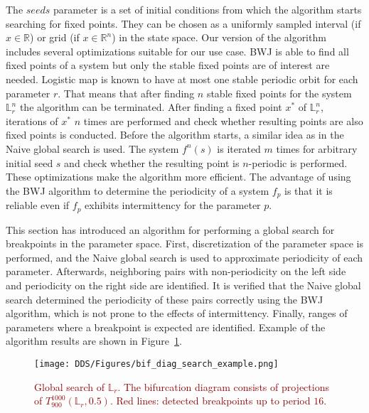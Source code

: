 The $seeds$ parameter is a set of initial conditions from which the algorithm starts searching for fixed points.
They can be chosen as a uniformly sampled interval (if $x \in \mathbb{R}$) or grid (if $x \in \mathbb{R}^{n}$) in the state space.
Our version of the algorithm includes several optimizations suitable for our use case.
BWJ is able to find all fixed points of a system but only the stable fixed points are of interest are needed.
Logistic map is known to have at most one stable periodic orbit for each parameter $r$.
That means that after finding $n$ stable fixed points for the system $\mathbb{L}_{r}^{n}$ the algorithm can be terminated.
After finding a fixed point $x^{*}$ of $\mathbb{L}_{r}^{n}$, iterations of $x^{*}$ $n$ times are performed and check whether resulting points are also fixed points is conducted.
Before the algorithm starts, a similar idea as in the Naive global search is used.
The system $f^{n}(s)$ is iterated $m$ times for arbitrary initial seed $s$ and check whether the resulting point is $n$-periodic is performed.
These optimizations make the algorithm more efficient.
The advantage of using the BWJ algorithm to determine the periodicity of a system $f_{p}$ is that it is reliable even if $f_{p}$ exhibits intermittency for the parameter $p$.
\par
This section has introduced an algorithm for performing a global search for breakpoints in the parameter space.
First, discretization of the parameter space is performed, and the Naive global search is used to approximate periodicity of each parameter.
Afterwards, neighboring pairs with non-periodicity on the left side and periodicity on the right side are identified.
It is verified that the Naive global search determined the periodicity of these pairs correctly using the BWJ algorithm, which is not prone to the effects of intermittency.
Finally, ranges of parameters where a breakpoint is expected are identified.
Example of the algorithm results are shown in Figure~\ref{fig:bif_diag_search_example}.

\begin{figure}[!h]
    \centering
    \texttt{[image: DDS/Figures/bif\_diag\_search\_example.png]}
    \caption{
        \textcolor{darkred}{
        Global search of $\mathbb{L}_{r}$.
        The bifurcation diagram consists of projections of $T_{900}^{1000}(\mathbb{L}_{r}, 0.5)$.
        Red lines: detected breakpoints up to period $16$.
        }
    }
    \label{fig:bif_diag_search_example}
\end{figure}

